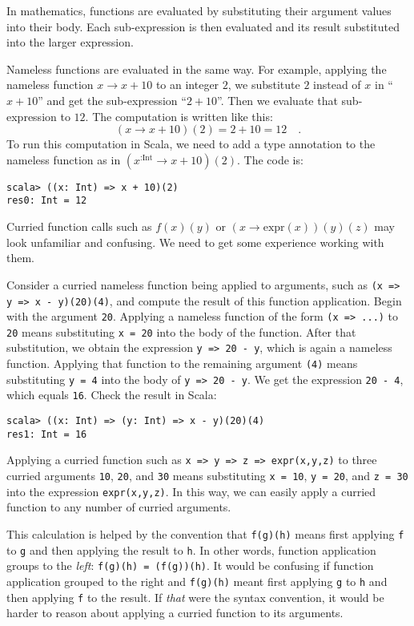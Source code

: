 In mathematics, functions are evaluated by substituting their argument
values into their body. Each sub-expression is then evaluated and
its result substituted into the larger expression.

Nameless functions are evaluated in the same way. For example, applying
the nameless function $x\rightarrow x+10$ to an integer $2$, we
substitute $2$ instead of $x$ in \textquotedblleft $x+10$\textquotedblright{}
and get the sub-expression \textquotedblleft $2+10$\textquotedblright .
Then we evaluate that sub-expression to $12$. The computation is
written like this:
\[
(x\rightarrow x+10)(2)=2+10=12\quad.
\]
To run this computation in Scala, we need to add a type annotation
to the nameless function as in $(x^{:\text{Int}}\rightarrow x+10)(2)$.
The code is:
\begin{lstlisting}
scala> ((x: Int) => x + 10)(2)
res0: Int = 12 
\end{lstlisting}

Curried function calls such as $f(x)(y)$ or $\left(x\rightarrow\text{expr}(x)\right)(y)(z)$
may look unfamiliar and confusing. We need to get some experience
working with them.

Consider a curried nameless function being applied to arguments, such
as \lstinline!(x => y => x - y)(20)(4)!, and compute the result of
this function application. Begin with the argument \lstinline!20!.
Applying a nameless function of the form \lstinline!(x => ...)! to
\lstinline!20! means substituting \lstinline!x = 20! into the body
of the function. After that substitution, we obtain the expression
\lstinline!y => 20 - y!, which is again a nameless function. Applying
that function to the remaining argument \lstinline!(4)! means substituting
\lstinline!y = 4! into the body of \lstinline!y => 20 - y!. We get
the expression \lstinline!20 - 4!, which equals \lstinline!16!.
Check the result in Scala:
\begin{lstlisting}
scala> ((x: Int) => (y: Int) => x - y)(20)(4)
res1: Int = 16
\end{lstlisting}

Applying a curried function such as \lstinline!x => y => z => expr(x,y,z)!
to three curried arguments \lstinline!10!, \lstinline!20!, and \lstinline!30!
means substituting \lstinline!x = 10!, \lstinline!y = 20!, and \lstinline!z = 30!
into the expression \lstinline!expr(x,y,z)!. In this way, we can
easily apply a curried function to any number of curried arguments.

This calculation is helped by the convention that \lstinline!f(g)(h)!
means first applying \lstinline!f! to \lstinline!g! and then applying
the result to \lstinline!h!. In other words, function application
groups to the \emph{left}: \lstinline!f(g)(h) = (f(g))(h)!. It would
be confusing if function application grouped to the right and \lstinline!f(g)(h)!
meant first applying \lstinline!g! to \lstinline!h! and then applying
\lstinline!f! to the result. If \emph{that} were the syntax convention,
it would be harder to reason about applying a curried function to
its arguments.

